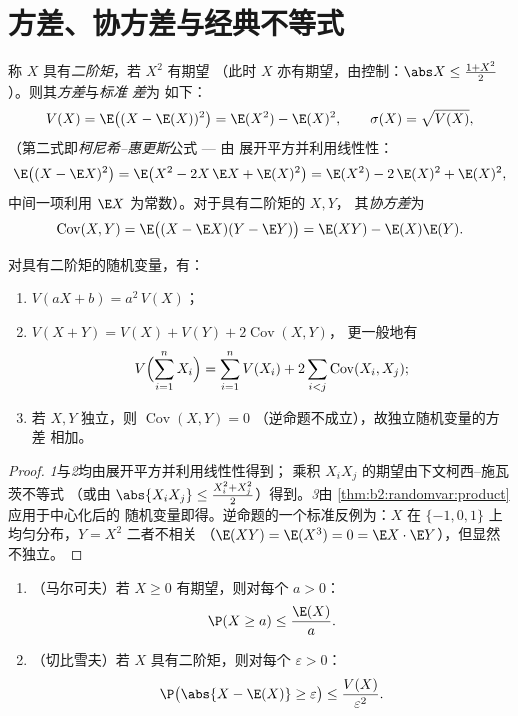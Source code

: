 \section{方差、协方差与经典不等式}

\begin{definition}[矩与方差]\label{def:b2:randomvar:variance}
称 $X$ 具有\emph{二阶矩}，若 $X^2$ 有期望
（此时 $X$ 亦有期望，由控制：$\abs X \leq \frac{1 +
X^2}{2}$）。则其\emph{方差}与\emph{标准
差}为
如下：
\[
V(X) = \E\bigl((X - \E(X))^2\bigr)
= \E(X^2) - \E(X)^2 ,
\qquad
\sigma(X) = \sqrt{V(X)} ,
\]
（第二式即\emph{柯尼希--惠更斯}公式 --- 由
展开平方并利用线性性：
\[
\E\bigl((X - \E X)^2\bigr)
= \E\bigl(X^2 - 2X\,\E X + \E(X)^2\bigr)
= \E(X^2) - 2\,\E(X)^2 + \E(X)^2 ,
\]
中间一项利用 $\E X$ 为常数）。对于具有二阶矩的 $X, Y$，
其\emph{协方差}为
\[
\operatorname{Cov}(X, Y)
= \E\bigl((X - \E X)(Y - \E Y)\bigr)
= \E(XY) - \E(X)\E(Y) .
\]
\end{definition}

\begin{theorem}[方差的常用性质]\label{thm:b2:randomvar:variancerules}
对具有二阶矩的随机变量，有：
\begin{enumerate}
\item $V(aX + b) = a^2\,V(X)$；
\item $V(X + Y) = V(X) + V(Y) + 2\operatorname{Cov}(X, Y)$，
更一般地有
\[
V\Bigl(\sum_{i=1}^n X_i\Bigr)
= \sum_{i=1}^n V(X_i)
+ 2\sum_{i < j}\operatorname{Cov}(X_i, X_j) ;
\]
\item 若 $X, Y$ 独立，则 $\operatorname{Cov}(X, Y) = 0$
（逆命题不成立），故独立随机变量的方差
相加。
\end{enumerate}
\end{theorem}

\begin{proof}
\emph{1}与\emph{2}均由展开平方并利用线性性得到；
乘积 $X_iX_j$ 的期望由下文柯西--施瓦茨不等式
（或由 $\abs{X_iX_j} \leq \frac{X_i^2 + X_j^2}{2}$）得到。\emph{3}由
\cref{thm:b2:randomvar:product}应用于中心化后的
随机变量即得。逆命题的一个标准反例为：$X$ 在
$\{-1, 0, 1\}$ 上均匀分布，$Y = X^2$ 二者不相关
（$\E(XY) = \E(X^3) = 0 = \E X \cdot \E Y$），但显然不独立。
\end{proof}

\begin{theorem}\label{thm:b2:randomvar:markov}
\leavevmode
\begin{enumerate}
\item （马尔可夫）若 $X \geq 0$ 有期望，则对每个 $a
> 0$：
\[
\P(X \geq a) \leq \frac{\E(X)}{a} .
\]
\item （切比雪夫）若 $X$ 具有二阶矩，则对每个
$\varepsilon > 0$：
\[
\P\bigl(\abs{X - \E(X)} \geq \varepsilon\bigr)
\leq \frac{V(X)}{\varepsilon^2} .
\]
\end{enumerate}
\end{theorem}


